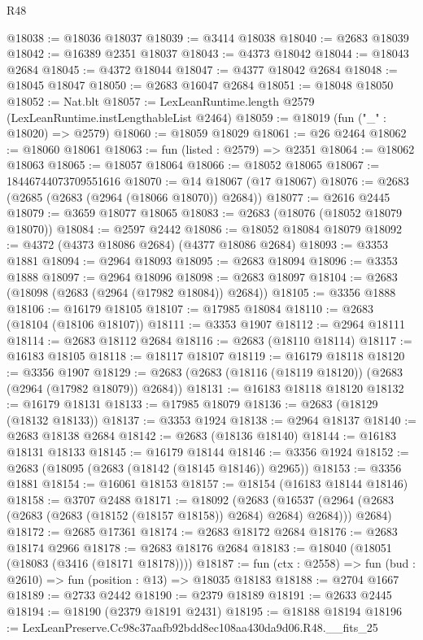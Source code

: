 \begin{lexlean}{R48}
\begin{coremodule}
@18038 := @18036 @18037
@18039 := @3414 @18038
@18040 := @2683 @18039
@18042 := @16389 @2351 @18037
@18043 := @4373 @18042
@18044 := @18043 @2684
@18045 := @4372 @18044
@18047 := @4377 @18042 @2684
@18048 := @18045 @18047
@18050 := @2683 @16047 @2684
@18051 := @18048 @18050
@18052 := Nat.blt
@18057 := LexLeanRuntime.length @2579 (LexLeanRuntime.instLengthableList @2464)
@18059 := @18019 (fun ("_" : @18020) => @2579)
@18060 := @18059 @18029
@18061 := @26 @2464
@18062 := @18060 @18061
@18063 := fun (listed : @2579) => @2351
@18064 := @18062 @18063
@18065 := @18057 @18064
@18066 := @18052 @18065
@18067 := 18446744073709551616
@18070 := @14 @18067 (@17 @18067)
@18076 := @2683 (@2685 (@2683 (@2964 (@18066 @18070)) @2684))
@18077 := @2616 @2445
@18079 := @3659 @18077 @18065
@18083 := @2683 (@18076 (@18052 @18079 @18070))
@18084 := @2597 @2442
@18086 := @18052 @18084 @18079
@18092 := @4372 (@4373 @18086 @2684) (@4377 @18086 @2684)
@18093 := @3353 @1881
@18094 := @2964 @18093
@18095 := @2683 @18094
@18096 := @3353 @1888
@18097 := @2964 @18096
@18098 := @2683 @18097
@18104 := @2683 (@18098 (@2683 (@2964 (@17982 @18084)) @2684))
@18105 := @3356 @1888
@18106 := @16179 @18105
@18107 := @17985 @18084
@18110 := @2683 (@18104 (@18106 @18107))
@18111 := @3353 @1907
@18112 := @2964 @18111
@18114 := @2683 @18112 @2684
@18116 := @2683 (@18110 @18114)
@18117 := @16183 @18105
@18118 := @18117 @18107
@18119 := @16179 @18118
@18120 := @3356 @1907
@18129 := @2683 (@2683 (@18116 (@18119 @18120)) (@2683 (@2964 (@17982 @18079)) @2684))
@18131 := @16183 @18118 @18120
@18132 := @16179 @18131
@18133 := @17985 @18079
@18136 := @2683 (@18129 (@18132 @18133))
@18137 := @3353 @1924
@18138 := @2964 @18137
@18140 := @2683 @18138 @2684
@18142 := @2683 (@18136 @18140)
@18144 := @16183 @18131 @18133
@18145 := @16179 @18144
@18146 := @3356 @1924
@18152 := @2683 (@18095 (@2683 (@18142 (@18145 @18146)) @2965))
@18153 := @3356 @1881
@18154 := @16061 @18153
@18157 := @18154 (@16183 @18144 @18146)
@18158 := @3707 @2488
@18171 := @18092
    (@2683
      (@16537 (@2964 (@2683 (@2683 (@2683 (@18152 (@18157 @18158)) @2684) @2684) @2684)))
      @2684)
@18172 := @2685 @17361
@18174 := @2683 @18172 @2684
@18176 := @2683 @18174 @2966
@18178 := @2683 @18176 @2684
@18183 := @18040 (@18051 (@18083 (@3416 (@18171 @18178))))
@18187 := fun (ctx : @2558) => fun (bud : @2610) => fun (position : @13) => @18035 @18183
@18188 := @2704 @1667
@18189 := @2733 @2442
@18190 := @2379 @18189
@18191 := @2633 @2445
@18194 := @18190 (@2379 @18191 @2431)
@18195 := @18188 @18194
@18196 := LexLeanPreserve.Cc98c37aafb92bdd8ec108aa430da9d06.R48.__fits_25

\end{coremodule}
\end{lexlean}
